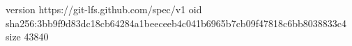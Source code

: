 version https://git-lfs.github.com/spec/v1
oid sha256:3bb9f9d83dc18cb64284a1beeceeb4c041b6965b7cb09f47818c6bb8038833c4
size 43840
